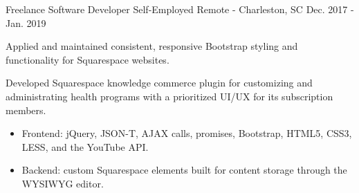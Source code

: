 \begin{cventries}
  \cventry
    {Freelance Software Developer} %
    {Self-Employed} %
    {Remote - Charleston, SC} %
    {Dec. 2017 - Jan. 2019} %
    {
      \begin{cvitems} %
        \item {Applied and maintained consistent, responsive Bootstrap styling and functionality for Squarespace websites.}
        \item {Developed Squarespace knowledge commerce plugin for customizing and administrating health programs with a prioritized UI/UX for its subscription members.}
        \begin{itemize}
          \vspace{1.0mm}
          \item {Frontend: jQuery, JSON-T, AJAX calls, promises, Bootstrap, HTML5, CSS3, LESS, and the YouTube API.}
          \vspace{1.0mm}
          \item {Backend: custom Squarespace elements built for content storage through the WYSIWYG editor.}
        \end{itemize}
      \end{cvitems}
    }


\end{cventries}
